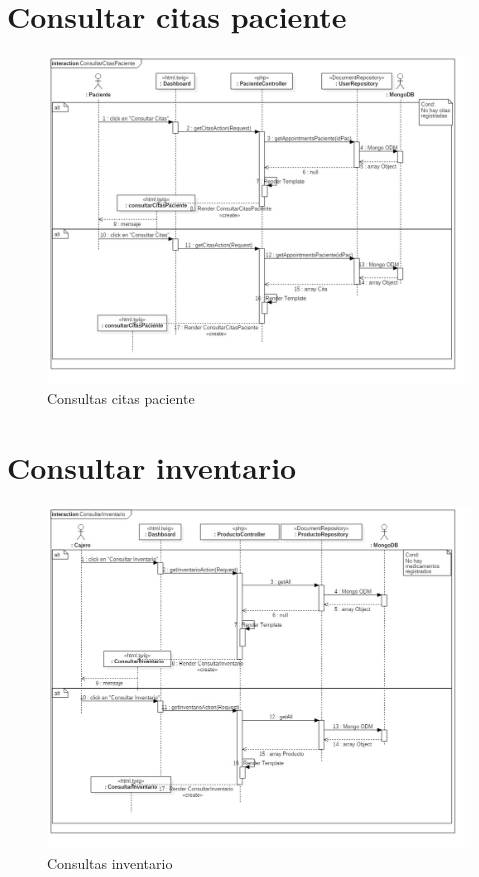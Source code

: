 \section{Consultar citas paciente}
	\begin{figure}[htbp!]
		\centering
			\includegraphics[width=1\textwidth]{uml/DiagramasSecuencia/DemisGomez/consultarCitasPaciente}
		\caption{Consultas citas paciente}
	\end{figure}
	\newpage
\section{Consultar inventario}
	\begin{figure}[htbp!]
		\centering
			\includegraphics[width=1\textwidth]{uml/DiagramasSecuencia/DemisGomez/consultarInventario}
		\caption{Consultas inventario}
	\end{figure}
	\newpage
